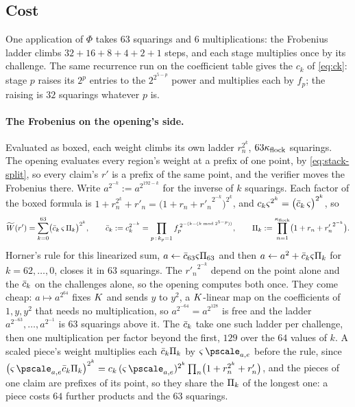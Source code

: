 \subsection{Cost}\label{rs:cost}

One application of $\Phi$ takes $63$ squarings and $6$ multiplications: the Frobenius ladder climbs $32+16+8+4+2+1$ steps, and each stage multiplies once by its challenge. The same recurrence run on the coefficient table gives the $c_k$ of \eqref{eq:ck}: stage $p$ raises its $2^p$ entries to the $2^{2^{5-p}}$ power and multiplies each by $f_p$; the raising is $32$ squarings whatever $p$ is.

\paragraph{The Frobenius on the opening's side.} Evaluated as boxed, each weight climbs its own ladder $r_n^{2^k}$, $63\kappa_{\mathrm{flock}}$ squarings. The opening evaluates every region's weight at a prefix of one point, by \eqref{eq:stack-split}, so every claim's $r'$ is a prefix of the same point, and the verifier moves the Frobenius there. Write $a^{2^{-k}}:=a^{2^{192-k}}$ for the inverse of $k$ squarings. Each factor of the boxed formula is $1+r_n^{2^k}+r'_n=\bigl(1+r_n+{r'_n}^{2^{-k}}\bigr)^{2^k}$, and $c_k\varsigma^{2^k}=\bigl(\bar c_k\,\varsigma\bigr)^{2^k}$, so
\[
\widetilde{W}(r')=\sum_{k=0}^{63}\bigl(\bar c_k\,\varsigma\,\Pi_k\bigr)^{2^k},
\qquad
\bar c_k:=c_k^{2^{-k}}=\prod_{p\,:\,k_p=1}f_p^{\,2^{-(k-(k\bmod 2^{5-p}))}},
\qquad
\Pi_k:=\prod_{n=1}^{\kappa_{\mathrm{flock}}}\bigl(1+r_n+{r'_n}^{2^{-k}}\bigr).
\]
Horner's rule for this linearized sum, $a\leftarrow\bar c_{63}\varsigma\Pi_{63}$ and then $a\leftarrow a^2+\bar c_k\varsigma\Pi_k$ for $k=62,\dots,0$, closes it in $63$ squarings. The ${r'_n}^{2^{-k}}$ depend on the point alone and the $\bar c_k$ on the challenges alone, so the opening computes both once. They come cheap: $a\mapsto a^{2^{64}}$ fixes $K$ and sends $y$ to $y^2$, a $K$-linear map on the coefficients of $1,y,y^2$ that needs no multiplication, so $a^{2^{-64}}=a^{2^{128}}$ is free and the ladder $a^{2^{-63}},\dots,a^{2^{-1}}$ is $63$ squarings above it. The $\bar c_k$ take one such ladder per challenge, then one multiplication per factor beyond the first, $129$ over the $64$ values of $k$. A scaled piece's weight multiplies each $\bar c_k\Pi_k$ by $\rsscale\,\pscale_{a,e}$ before the rule, since $\bigl(\rsscale\,\pscale_{a,e}\cbar_k\fprod_k\bigr)^{2^k}=c_k\,(\rsscale\,\pscale_{a,e})^{2^k}\prod_n\bigl(1+r_n^{2^k}+r'_n\bigr)$, and the pieces of one claim are prefixes of its point, so they share the $\Pi_k$ of the longest one: a piece costs $64$ further products and the $63$ squarings.

